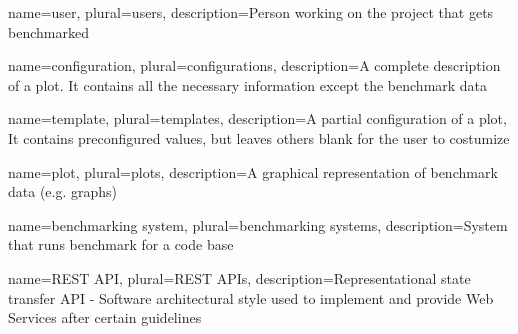 \makenoidxglossaries

{
	name=user,
	plural=users,
	description={Person working on the project that gets benchmarked}
}

{
	name=configuration,
	plural=configurations,
	description={A complete description of a \gls{plot}. It contains all the necessary information except the benchmark data}
}

{
	name=template,
	plural=templates,
	description={A partial configuration of a \gls{plot}, It contains preconfigured values, but leaves others blank for the user to costumize}
}

{
	name=plot,
	plural=plots,
	description={A graphical representation of benchmark data (e.g. graphs)}
}

{
	name=benchmarking system,
	plural=benchmarking systems,
	description={System that runs benchmark for a code base}
}

{
	name=REST API,
	plural=REST APIs,
	description={Representational state transfer API - Software architectural style used to implement and provide Web Services after certain guidelines}
}



